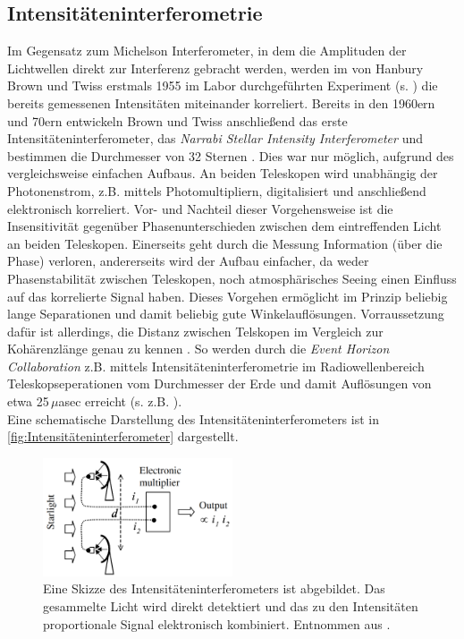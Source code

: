 \subsection{Intensitäteninterferometrie}
\label{ssec:Intensitäteninterferometrie}
Im Gegensatz zum Michelson Interferometer, in dem die Amplituden der Lichtwellen direkt zur Interferenz gebracht werden, werden im von Hanbury Brown und Twiss erstmals 1955 im Labor durchgeführten Experiment (s. \cite{brownCorrelationPhotonsTwo1956}) die bereits gemessenen Intensitäten miteinander korreliert. 
Bereits in den 1960ern und 70ern entwickeln Brown und Twiss anschließend das erste Intensitäteninterferometer, das \emph{Narrabi Stellar Intensity Interferometer} und bestimmen die Durchmesser von 32 Sternen \cite[Kap. 1]{brownIntensityInterferometerIts1974}. 
Dies war nur möglich, aufgrund des vergleichsweise einfachen Aufbaus. 
An beiden Teleskopen wird unabhängig der Photonenstrom, z.B. mittels Photomultipliern, digitalisiert und anschließend elektronisch korreliert. 
Vor- und Nachteil dieser Vorgehensweise ist die Insensitivität gegenüber Phasenunterschieden zwischen dem eintreffenden Licht an beiden Teleskopen. 
Einerseits geht durch die Messung Information (über die Phase) verloren, andererseits wird der Aufbau einfacher, da weder Phasenstabilität zwischen Teleskopen, noch atmosphärisches Seeing einen Einfluss auf das korrelierte Signal haben.
Dieses Vorgehen ermöglicht im Prinzip beliebig lange Separationen und damit beliebig gute Winkelauflösungen. 
Vorraussetzung dafür ist allerdings, die Distanz zwischen Telskopen im Vergleich zur Kohärenzlänge genau zu kennen \cite{foellmiIntensityInterferometrySecondorder2009}. 
So werden durch die \emph{Event Horizon Collaboration} z.B. mittels Intensitäteninterferometrie im Radiowellenbereich Teleskopseperationen vom Durchmesser der Erde und damit Auflösungen von etwa 25\,$\mu$asec erreicht (s. z.B. \cite{collaborationFirstSagittariusEvent2022}). \\

Eine schematische Darstellung des Intensitäteninterferometers ist in \autoref{fig:Intensitäteninterferometer} dargestellt. 
\begin{figure}[htbp]
    \centering
    \includegraphics[width=0.5\textwidth]{images/Theorie/Fox_6.1b.png}
    \caption{Eine Skizze des Intensitäteninterferometers ist abgebildet. Das gesammelte Licht wird direkt detektiert und das zu den Intensitäten proportionale Signal elektronisch kombiniert. Entnommen aus \cite[Fig. 6.1(b)]{foxQuantumOpticsIntroduction2006}.}
    \label{fig:Intensitäteninterferometer}
\end{figure}

